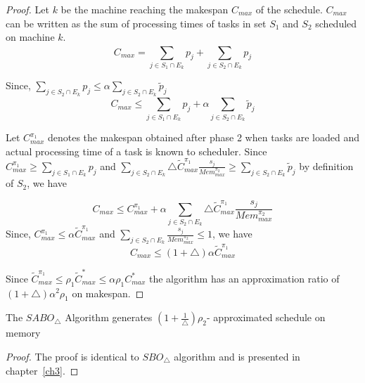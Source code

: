 \documentclass[twocolumn]{svjour3}
\begin{document}
\begin{proof}
  Let $k$ be the machine reaching the makespan $C_{max}$ of the
  schedule. $C_{max}$ can be written as the sum of processing times of
  tasks in set $S_1$ and $S_2$ scheduled on machine $k$.
  \begin{equation}\nonumber
    C_{max}= \sum_{j \in S_1 \cap E_k}^{}p_j+\sum_{j \in S_2 \cap E_k}^{}p_j 
  \end{equation}
  
  Since, $\sum\limits
  _{j \in S_2 \cap E_k}^{}p_j\leq\alpha\sum\limits
  _{j \in S_2 \cap E_k} \tilde{p}_j$
  \begin{equation}\nonumber
    C_{max} \leq \sum_{j \in S_1 \cap E_k}^{}p_j+\alpha\sum_{j \in S_2 \cap E_k} \tilde{p}_j 
  \end{equation}
  
  
  Let $C^{\pi_1}_{max}$ denotes the makespan obtained after phase 2
  when tasks are loaded and actual processing time of a task is known
  to scheduler. Since $C^{\pi_1}_{max} \geq \sum\limits _{j \in S_1
    \cap E_k}^{}p_j$ and $\sum\limits _{j \in S_2\cap E_k}\triangle
  {\tilde{C}^{\pi_1}_{max}} \frac{s_j}{Mem^{\pi_2}_{max}}\geq
  \sum\limits _{j \in S_2\cap E_k}^{}\tilde{p}_j $ by definition of
  $S_2$, we have
          
  \begin{equation}\nonumber
    C_{max}\leq C^{\pi_1}_{max}+\alpha\sum_{j \in S_2\cap E_k}^{}\triangle {\tilde{C}^{\pi_1}_{max}} \frac{s_j}{Mem^{\pi_2}_{max}}
  \end{equation}                    
  Since, $C^{\pi_1}_{max}\leq\alpha\tilde{C}^{\pi_1}_{max}$ and
  $\sum\limits_{j \in S_2\cap E_k} \frac{s_j}{Mem^{\pi_2}_{max}}\leq 1$,
  we have
  \begin{equation}
    \nonumber C_{max}\leq(1+\triangle)\alpha\tilde{C}^{\pi_1}_{max}
  \end{equation}
  
  Since $ \tilde{C}^{\pi_1}_{max} \leq \rho_1 \tilde{C}^{*}_{max}\leq
  \alpha\rho_1 {C}^{*}_{max}$ the algorithm has an approximation ratio
  of $(1+\triangle)\alpha^2 \rho_1$ on makespan.
\end{proof}
\begin{theorem} \label{th:chapter5-2b} The $SABO_\triangle$ Algorithm
  generates $ (1+\frac{1}{\triangle})\rho_2 $- approximated schedule
  on memory
\end{theorem}                      

\begin{proof}  
  The proof is identical to $SBO_\triangle$ algorithm and is presented
  in chapter~\ref{ch3}.
\end{proof}    
    
\end{document}
